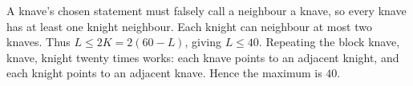 A knave's chosen statement must falsely call a neighbour a knave, so every knave has at least one knight neighbour. Each knight can neighbour at most two knaves. Thus $L\le2K=2(60-L)$, giving $L\le40$. Repeating the block knave, knave, knight twenty times works: each knave points to an adjacent knight, and each knight points to an adjacent knave. Hence the maximum is $\boxed{40}$.
